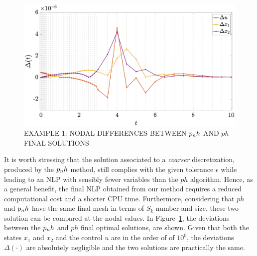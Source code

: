 \begin{figure}[t]
	\centering
	\includegraphics[trim={2cm 0.5cm 4cm 0.3cm},clip,width=1\columnwidth]{Img/delta_vanderpol}
	\caption{EXAMPLE 1: NODAL DIFFERENCES BETWEEN $p_{n}h$ AND $ph$ FINAL SOLUTIONS}
	\label{fig:deltavanderpol}
\end{figure}
It is worth stressing that the solution associated to a \emph{coarser} discretization, produced by the $p_{n}h$ method, still complies with the given tolerance $\epsilon$ while leading to an NLP with sensibly fewer variables than the $ph$ algorithm.
Hence, as a general benefit, the final NLP obtained from our method requires a reduced computational cost and a shorter CPU time.
Furthermore, considering that $ph$ and $p_{n}h$ have the same final mesh in terms of $S_k$ number and size, these two solution can be compared at the nodal values.
In Figure~\ref{fig:deltavanderpol}, the deviations between the $p_{n}h$ and $ph$ final optimal solutions, are shown.
Given that both the states $x_1$ and $x_2$ and the control $u$ are in the order of of $10^{0}$, the deviations $\Delta(\cdot)$ are absolutely negligible and the two solutions are practically the same.

